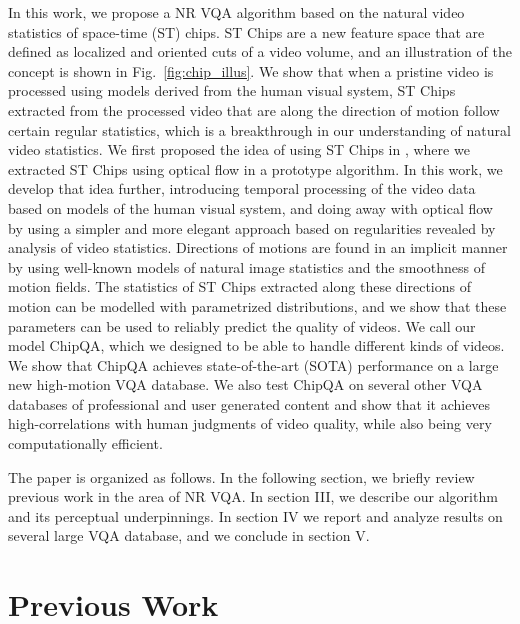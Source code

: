 \documentclass[journal]{IEEEtran}
\begin{document}
In this work, we propose a NR VQA algorithm based on the natural video statistics of space-time (ST) chips. ST Chips are a new feature space that are defined as localized and oriented cuts of a video volume, and an illustration of the concept is shown in Fig.~\ref{fig:chip_illus}. We show that when a pristine video is processed using models derived from the human visual system, ST Chips extracted from the processed video that are along the direction of motion follow certain regular statistics, which is a breakthrough in our understanding of natural video statistics. We first proposed the idea of using ST Chips in \cite{chipqa0}, where we extracted ST Chips using optical flow in a prototype algorithm. In this work, we develop that idea further, introducing temporal processing of the video data based on models of the human visual system, and doing away with optical flow by using a simpler and more elegant approach based on regularities revealed by analysis of video statistics. Directions of motions are found in an implicit manner by using well-known models of natural image statistics and the smoothness of motion fields. The statistics of ST Chips extracted along these directions of motion can be modelled with parametrized distributions, and we show that these parameters can be used to reliably predict the quality of videos. We call our model ChipQA, which we designed to be able to handle different kinds of videos. We show that ChipQA achieves state-of-the-art (SOTA) performance on a large new high-motion VQA database. We also test ChipQA on several other VQA databases of professional and user generated content and show that it achieves high-correlations with human judgments of video quality, while also being very computationally efficient. 

The paper is organized as follows. In the following section, we briefly review previous work in the area of NR VQA. In section III, we describe our algorithm and its perceptual underpinnings. In section IV we report and analyze results on several large VQA database, and we conclude in section V.

\section{Previous Work}
\end{document}
